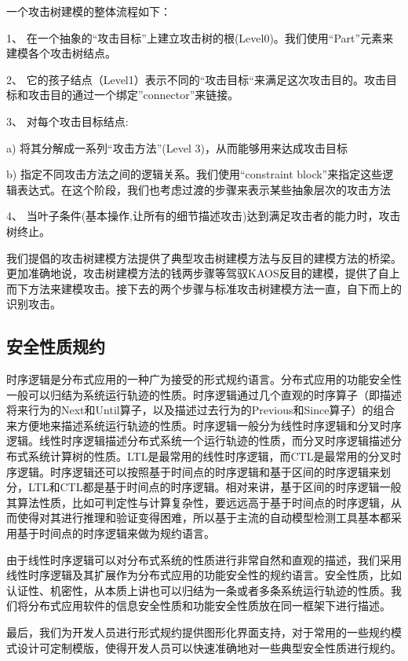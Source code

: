 \par
一个攻击树建模的整体流程如下：
\par
1、	在一个抽象的“攻击目标”上建立攻击树的根(Level0)。我们使用“Part”元素来建模各个攻击树结点。
\par
2、	它的孩子结点（Level1）表示不同的“攻击目标“来满足这次攻击目的。攻击目标和攻击目的通过一个绑定”connector”来链接。
\par
3、	对每个攻击目标结点:
\par
a)	将其分解成一系列“攻击方法”(Level 3)，从而能够用来达成攻击目标
\par
b)	指定不同攻击方法之间的逻辑关系。我们使用“constraint block”来指定这些逻辑表达式。在这个阶段，我们也考虑过渡的步骤来表示某些抽象层次的攻击方法
\par
4、	当叶子条件(基本操作,让所有的细节描述攻击)达到满足攻击者的能力时，攻击树终止。
\par
我们提倡的攻击树建模方法提供了典型攻击树建模方法与反目的建模方法的桥梁。更加准确地说，攻击树建模方法的钱两步骤等驾驭KAOS反目的建模，提供了自上而下方法来建模攻击。接下去的两个步骤与标准攻击树建模方法一直，自下而上的识别攻击。
\subsection{安全性质规约}
\par
时序逻辑是分布式应用的一种广为接受的形式规约语言。分布式应用的功能安全性一般可以归结为系统运行轨迹的性质。时序逻辑通过几个直观的时序算子（即描述将来行为的Next和Until算子，以及描述过去行为的Previous和Since算子）的组合来方便地来描述系统运行轨迹的性质。时序逻辑一般分为线性时序逻辑和分叉时序逻辑。线性时序逻辑描述分布式系统一个运行轨迹的性质，而分叉时序逻辑描述分布式系统计算树的性质。LTL是最常用的线性时序逻辑，而CTL是最常用的分叉时序逻辑。时序逻辑还可以按照基于时间点的时序逻辑和基于区间的时序逻辑来划分，LTL和CTL都是基于时间点的时序逻辑。相对来讲，基于区间的时序逻辑一般其算法性质，比如可判定性与计算复杂性，要远远高于基于时间点的时序逻辑，从而使得对其进行推理和验证变得困难，所以基于主流的自动模型检测工具基本都采用基于时间点的时序逻辑来做为规约语言。
\par
由于线性时序逻辑可以对分布式系统的性质进行非常自然和直观的描述，我们采用线性时序逻辑及其扩展作为分布式应用的功能安全性的规约语言。安全性质，比如认证性、机密性，从本质上讲也可以归结为一条或者多条系统运行轨迹的性质。我们将分布式应用软件的信息安全性质和功能安全性质放在同一框架下进行描述。
\par
最后，我们为开发人员进行形式规约提供图形化界面支持，对于常用的一些规约模式设计可定制模版，使得开发人员可以快速准确地对一些典型安全性质进行规约。